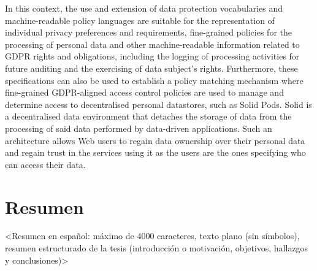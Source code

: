In this context, the use and extension of data protection vocabularies and machine-readable policy languages are suitable for the representation of individual privacy preferences and requirements, fine-grained policies for the processing of personal data and other machine-readable information related to GDPR rights and obligations, including the logging of processing activities for future auditing and the exercising of data subject’s rights.
Furthermore, these specifications can also be used to establish a policy matching mechanism where fine-grained GDPR-aligned access control policies are used to manage and determine access to decentralised personal datastores, such as Solid Pods.
Solid is a decentralised data environment that detaches the storage of data from the processing of said data performed by data-driven applications.
Such an architecture allows Web users to regain data ownership over their personal data and regain trust in the services using it as the users are the ones specifying who can access their data.

\newpage
\section*{Resumen}
\label{sec::resumen}


<Resumen en español: máximo de 4000 caracteres, texto plano (sin símbolos), resumen estructurado de la tesis (introducción o motivación, objetivos, hallazgos y conclusiones)>

